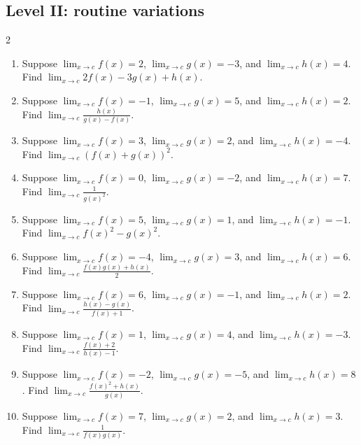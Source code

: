 \documentclass[11pt,oneside]{book}
\begin{document}
\subsection*{Level II: routine variations}
\begin{multicols}{2}
\begin{enumerate}[leftmargin=*,label=\textbf{\arabic*.},itemsep=0.65\baselineskip]
\item Suppose $\lim_{x\to c} f(x)=2$, $\lim_{x\to c} g(x)=-3$, and $\lim_{x\to c} h(x)=4$. Find $\displaystyle\lim_{x\to c} 2f(x)-3g(x)+h(x)$.
\item Suppose $\lim_{x\to c} f(x)=-1$, $\lim_{x\to c} g(x)=5$, and $\lim_{x\to c} h(x)=2$. Find $\displaystyle\lim_{x\to c} \frac{h(x)}{g(x)-f(x)}$.
\item Suppose $\lim_{x\to c} f(x)=3$, $\lim_{x\to c} g(x)=2$, and $\lim_{x\to c} h(x)=-4$. Find $\displaystyle\lim_{x\to c} \left(f(x)+g(x)\right)^2$.
\item Suppose $\lim_{x\to c} f(x)=0$, $\lim_{x\to c} g(x)=-2$, and $\lim_{x\to c} h(x)=7$. Find $\displaystyle\lim_{x\to c} \frac{1}{g(x)^2}$.
\item Suppose $\lim_{x\to c} f(x)=5$, $\lim_{x\to c} g(x)=1$, and $\lim_{x\to c} h(x)=-1$. Find $\displaystyle\lim_{x\to c} f(x)^2-g(x)^2$.
\item Suppose $\lim_{x\to c} f(x)=-4$, $\lim_{x\to c} g(x)=3$, and $\lim_{x\to c} h(x)=6$. Find $\displaystyle\lim_{x\to c} \frac{f(x)g(x)+h(x)}{2}$.
\item Suppose $\lim_{x\to c} f(x)=6$, $\lim_{x\to c} g(x)=-1$, and $\lim_{x\to c} h(x)=2$. Find $\displaystyle\lim_{x\to c} \frac{h(x)-g(x)}{f(x)+1}$.
\item Suppose $\lim_{x\to c} f(x)=1$, $\lim_{x\to c} g(x)=4$, and $\lim_{x\to c} h(x)=-3$. Find $\displaystyle\lim_{x\to c} \frac{f(x)+2}{h(x)-1}$.
\item Suppose $\lim_{x\to c} f(x)=-2$, $\lim_{x\to c} g(x)=-5$, and $\lim_{x\to c} h(x)=8$. Find $\displaystyle\lim_{x\to c} \frac{f(x)^2+h(x)}{g(x)}$.
\item Suppose $\lim_{x\to c} f(x)=7$, $\lim_{x\to c} g(x)=2$, and $\lim_{x\to c} h(x)=3$. Find $\displaystyle\lim_{x\to c} \frac{1}{f(x)g(x)}$.
\end{enumerate}
\end{multicols}
\end{document}
